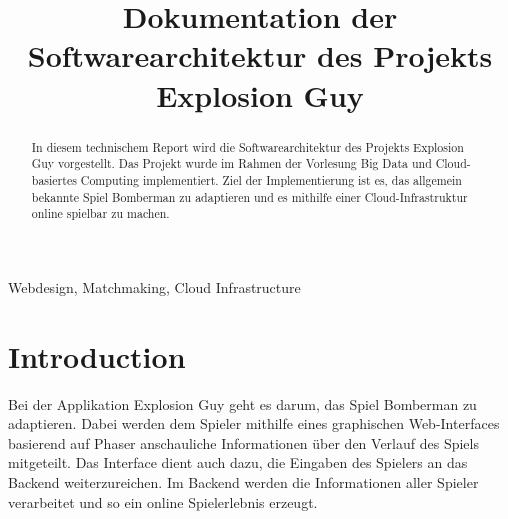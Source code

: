 \documentclass[conference]{IEEEtran}
\begin{document}
\title{Dokumentation der Softwarearchitektur des Projekts Explosion Guy}


\author{
	\and

	\and

	\and

	\and

}

\maketitle

\begin{abstract}
In diesem technischem Report wird die Softwarearchitektur des Projekts 
Explosion Guy vorgestellt. Das Projekt wurde im Rahmen der Vorlesung Big Data und Cloud-basiertes Computing implementiert. Ziel der Implementierung ist es, 
das allgemein bekannte Spiel \glqq Bomberman \grqq{} zu adaptieren und es mithilfe einer Cloud-Infrastruktur online spielbar zu machen.\\
\end{abstract}

\begin{IEEEkeywords}
 Webdesign, Matchmaking, Cloud Infrastructure
\end{IEEEkeywords}

\section{Introduction}
Bei der Applikation Explosion Guy geht es darum, das Spiel \glqq Bomberman\grqq{} zu adaptieren. Dabei werden dem Spieler mithilfe eines graphischen Web-Interfaces basierend auf Phaser anschauliche Informationen über den Verlauf des Spiels mitgeteilt. Das Interface dient auch dazu, die Eingaben des Spielers an das Backend weiterzureichen. Im Backend werden die Informationen aller Spieler verarbeitet und so ein online Spielerlebnis erzeugt.
\end{document}
